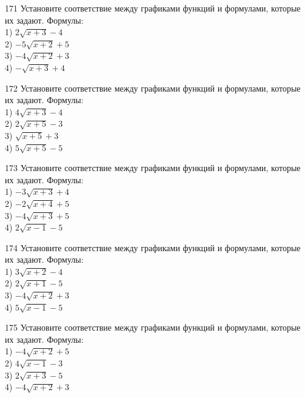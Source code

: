 \documentclass[4apaper]{article}
\begin{document}
\begin{taskBN}{171}
Установите соответствие между графиками функций и формулами, которые их задают. Формулы: \\1) $2\sqrt{x+3}-4$\\2) $-5\sqrt{x+2}+5$\\3) $-4\sqrt{x+2}+3$\\4) $-\sqrt{x+3}+4$
\end{taskBN}

\begin{taskBN}{172}
Установите соответствие между графиками функций и формулами, которые их задают. Формулы: \\1) $4\sqrt{x+3}-4$\\2) $2\sqrt{x+5}-3$\\3) $\sqrt{x+5}+3$\\4) $5\sqrt{x+5}-5$
\end{taskBN}

\begin{taskBN}{173}
Установите соответствие между графиками функций и формулами, которые их задают. Формулы: \\1) $-3\sqrt{x+3}+4$\\2) $-2\sqrt{x+4}+5$\\3) $-4\sqrt{x+3}+5$\\4) $2\sqrt{x-1}-5$
\end{taskBN}

\begin{taskBN}{174}
Установите соответствие между графиками функций и формулами, которые их задают. Формулы: \\1) $3\sqrt{x+2}-4$\\2) $2\sqrt{x+1}-5$\\3) $-4\sqrt{x+2}+3$\\4) $5\sqrt{x-1}-5$
\end{taskBN}

\begin{taskBN}{175}
Установите соответствие между графиками функций и формулами, которые их задают. Формулы: \\1) $-4\sqrt{x+2}+5$\\2) $4\sqrt{x-1}-3$\\3) $2\sqrt{x+3}-5$\\4) $-4\sqrt{x+2}+3$
\end{taskBN}
\end{document}
